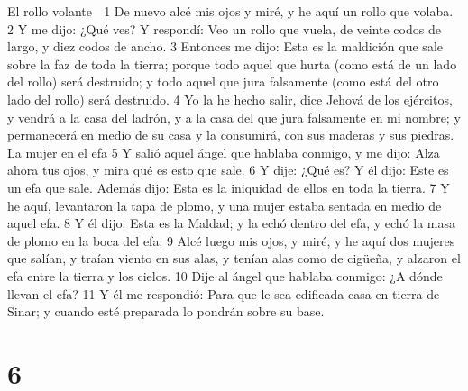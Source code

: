 El rollo volante

1 De nuevo alcé mis ojos y miré, y he aquí un rollo que volaba.
2 Y me dijo: ¿Qué ves? Y respondí: Veo un rollo que vuela, de veinte codos   de largo, y diez codos de ancho.
3 Entonces me dijo: Esta es la maldición que sale sobre la faz de toda la tierra; porque todo aquel que hurta (como está de un lado del rollo) será destruido; y todo aquel que jura falsamente (como está del otro lado del rollo) será destruido.
4 Yo la he hecho salir, dice Jehová de los ejércitos, y vendrá a la casa del ladrón, y a la casa del que jura falsamente en mi nombre; y permanecerá en medio de su casa y la consumirá, con sus maderas y sus piedras.
La mujer en el efa
5 Y salió aquel ángel que hablaba conmigo, y me dijo: Alza ahora tus ojos, y mira qué es esto que sale.
6 Y dije: ¿Qué es? Y él dijo: Este es un efa que sale. Además dijo: Esta es la iniquidad de ellos en toda la tierra.
7 Y he aquí, levantaron la tapa de plomo, y una mujer estaba sentada en medio de aquel efa. 
8 Y él dijo: Esta es la Maldad; y la echó dentro del efa, y echó la masa de plomo en la boca del efa.
9 Alcé luego mis ojos, y miré, y he aquí dos mujeres que salían, y traían viento en sus alas, y tenían alas como de cigüeña, y alzaron el efa entre la tierra y los cielos.
10 Dije al ángel que hablaba conmigo: ¿A dónde llevan el efa?
11 Y él me respondió: Para que le sea edificada casa en tierra de Sinar; y cuando esté preparada lo pondrán sobre su base.

\chapter{6}

